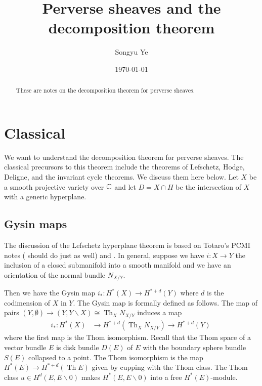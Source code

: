 \documentclass[12pt]{article}
\DeclareMathOperator{\Th}{Th}
\begin{document}
\rhead{\today}
\cfoot{\thepage}

\title{Perverse sheaves and the decomposition theorem}

\author{Songyu Ye}
\date{\today}
\maketitle


\begin{abstract}
    These are notes on the decomposition theorem for perverse sheaves. 
\end{abstract}

\tableofcontents

 



\section{Classical}
We want to understand the decomposition theorem for perverse sheaves. The classical
precursors to this theorem include the theorems of Lefschetz, Hodge, Deligne, and the invariant cycle theorems.
We discuss them here below. Let $X$ be a smooth projective variety over $\mathbb{C}$ and let $D = X \cap H$ be 
the intersection of $X$ with a generic hyperplane.

\subsection{Gysin maps}
The discussion of the Lefschetz hyperplane theorem is based on Totaro's PCMI notes (\cite{totaro} 
should do just as well) and \cite{griffiths-harris}. In general, suppose we have $i:X\to Y$ the inclusion of a
closed submanifold into a smooth manifold and we have an orientation of the normal 
bundle $N_{X/Y}$. 

\hfill

Then we have the Gysin map $i_*:H^*(X)\to H^{*+d}(Y)$ where $d$ is the codimension of $X$ in $Y$.
The Gysin map is formally defined as follows. The map of pairs $(Y,\emptyset)\to (Y,Y\backslash X) \cong
\Th_X N_{X/Y}$ induces a map \begin{align*}
    i_*:H^*(X) &\to H^{*+d}(\Th_X N_{X/Y}) \to H^{*+d}(Y)\
\end{align*} where the first map is the Thom isomorphism.
Recall that the Thom space of a vector bundle $E$ is disk bundle $D(E)$ of $E$ with the boundary
sphere bundle $S(E)$ collapsed to a point. The Thom isomorphism is the map $H^*(E)\to H^{*+d}(\Th E)$
given by cupping with the Thom class. The Thom class $u \in H^d(E,E\backslash 0)$ makes 
$H^*(E,E\backslash 0)$ into a free $H^*(E)$-module.
\end{document}
